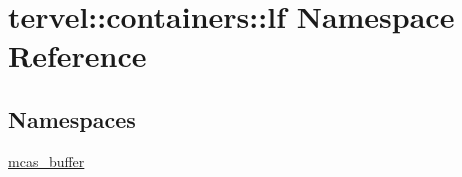 \hypertarget{namespacetervel_1_1containers_1_1lf}{}\section{tervel\+:\+:containers\+:\+:lf Namespace Reference}
\label{namespacetervel_1_1containers_1_1lf}
\subsection*{Namespaces}
\begin{DoxyCompactItemize}
\item 
 \hyperlink{namespacetervel_1_1containers_1_1lf_1_1mcas__buffer}{mcas\+\_\+buffer}
\end{DoxyCompactItemize}
